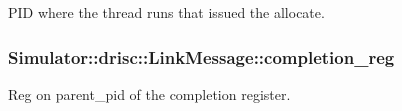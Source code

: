 P\+I\+D where the thread runs that issued the allocate. 

\hypertarget{struct_simulator_1_1drisc_1_1_link_message_ae6325eb9e8b62e2c15e491407b9dcff5}{
\subsubsection[{completion\+\_\+reg}]{ Simulator\+::drisc\+::\+Link\+Message\+::completion\+\_\+reg}}\label{struct_simulator_1_1drisc_1_1_link_message_ae6325eb9e8b62e2c15e491407b9dcff5}


Reg on parent\+\_\+pid of the completion register. 

